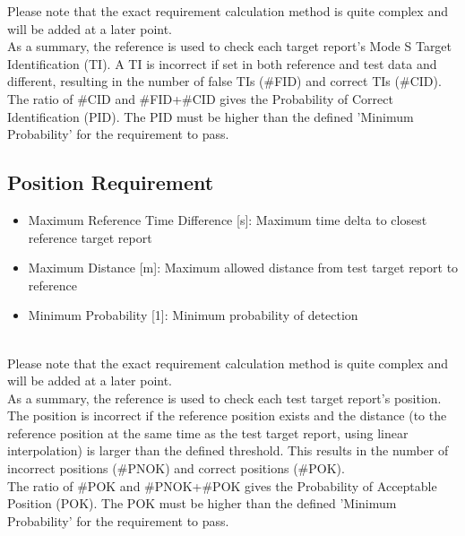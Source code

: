Please note that the exact requirement calculation method is quite complex and will be added at a later point. \\

As a summary, the reference is used to check each target report's Mode S Target Identification (TI). A TI is incorrect if set in both reference and test data and different, resulting in the number of false TIs (\#FID) and correct TIs (\#CID). \\

The ratio of \#CID and \#FID+\#CID gives the Probability of Correct Identification (PID). The PID must be higher than the defined 'Minimum Probability' for the requirement to pass.

\subsection{Position Requirement}

\begin{itemize}  
\item Maximum Reference Time Difference [s]: Maximum time delta to closest reference target report
\item Maximum Distance [m]: Maximum allowed distance from test target report to reference
\item Minimum Probability [1]: Minimum probability of detection
\end{itemize}
\ \\

Please note that the exact requirement calculation method is quite complex and will be added at a later point. \\

As a summary, the reference is used to check each test target report's position. The position is incorrect if the reference position exists and the distance (to the reference position at the same time as the test target report, using linear interpolation) is larger than the defined threshold. This results in the number of incorrect positions (\#PNOK) and correct positions (\#POK). \\

The ratio of \#POK and \#PNOK+\#POK gives the Probability of Acceptable Position (POK). The POK must be higher than the defined 'Minimum Probability' for the requirement to pass. 
